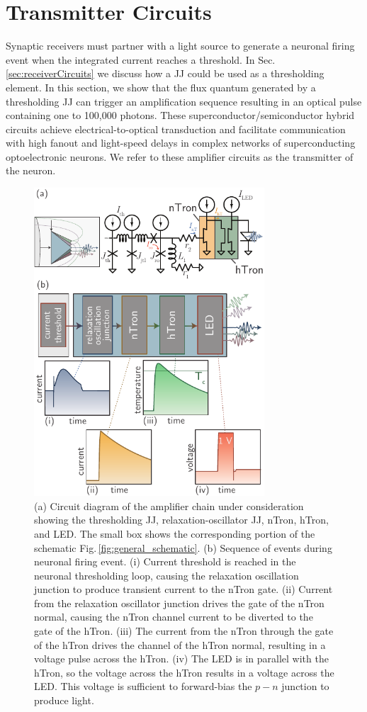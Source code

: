 \documentclass[aip,amsmath,amssymb,reprint,nofootinbib]{revtex4-1}
\begin{document}
\section{\label{sec:transmitterCircuits}Transmitter Circuits}
Synaptic receivers must partner with a light source to generate a neuronal firing event when the integrated current reaches a threshold. In Sec.\,\ref{sec:receiverCircuits} we discuss how a JJ could be used as a thresholding element. In this section, we show that the flux quantum generated by a thresholding JJ can trigger an amplification sequence resulting in an optical pulse containing one to 100,000 photons. These superconductor/semiconductor hybrid circuits achieve electrical-to-optical transduction and facilitate communication with high fanout and light-speed delays in complex networks of superconducting optoelectronic neurons. We refer to these amplifier circuits as the transmitter of the neuron.

\begin{figure}[t!]
	\centerline{\includegraphics[width=8.6cm]{_transmitters_schematic_small.pdf}}
	\caption{\label{fig:transmitters_schematic}(a) Circuit diagram of the amplifier chain under consideration showing the thresholding JJ, relaxation-oscillator JJ, nTron, hTron, and LED. The small box shows the corresponding portion of the schematic Fig.\,\ref{fig:general_schematic}. (b) Sequence of events during neuronal firing event. (i) Current threshold is reached in the neuronal thresholding loop, causing the relaxation oscillation junction to produce transient current to the nTron gate. (ii) Current from the relaxation oscillator junction drives the gate of the nTron normal, causing the nTron channel current to be diverted to the gate of the hTron. (iii) The current from the nTron through the gate of the hTron drives the channel of the hTron normal, resulting in a voltage pulse across the hTron. (iv) The LED is in parallel with the hTron, so the voltage across the hTron results in a voltage across the LED. This voltage is sufficient to forward-bias the $p-n$ junction to produce light.}
\end{figure}
	
\end{document}
